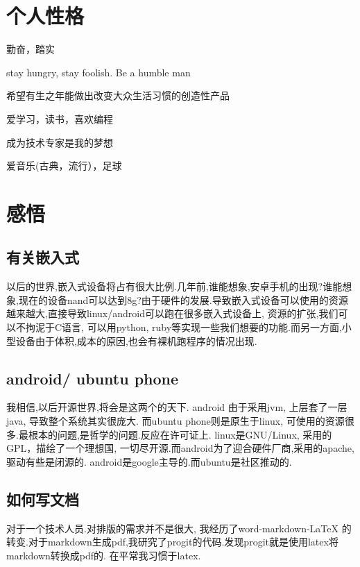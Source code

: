 \documentclass[titlepage]{article}
\begin{document}
\section{个人性格}

\begin{compactitem}
    \item 勤奋，踏实
    \item {\color{red}stay hungry, stay foolish. Be a humble man}
    \item 希望有生之年能做出{\color{red}改变大众生活习惯的创造性产品}
    \item 爱学习，读书，喜欢编程
    \item 成为技术专家是我的梦想
    \item 爱音乐(古典，流行），足球
\end{compactitem}




\section{感悟}
\subsection{有关嵌入式}
以后的世界,嵌入式设备将占有很大比例.几年前,谁能想象,安卓手机的出现?谁能想象,现在的设备nand可以达到8g?由于硬件的发展.导致嵌入式设备可以使用的资源越来越大,直接导致linux/android可以跑在很多嵌入式设备上, 资源的扩张,我们可以不拘泥于C语言, 可以用python, ruby等实现一些我们想要的功能.而另一方面,小型设备由于体积,成本的原因,也会有裸机跑程序的情况出现.

\subsection{android/ ubuntu phone}

我相信,以后开源世界,将会是这两个的天下. android 由于采用jvm, 上层套了一层java, 导致整个系统其实很庞大. 而ubuntu phone则是原生于linux, 可使用的资源很多.最根本的问题,是哲学的问题.反应在许可证上. linux是GNU/Linux, 采用的GPL，描绘了一个理想国, 一切尽开源.而android为了迎合硬件厂商,采用的apache, 驱动有些是闭源的. android是google主导的.而ubuntu是社区推动的.

\subsection{如何写文档}
对于一个技术人员.对排版的需求并不是很大, 我经历了word-markdown-LaTeX 的转变.对于markdown生成pdf,我研究了progit的代码.发现progit就是使用latex将markdown转换成pdf的. 在平常我习惯于latex.
\end{document}
